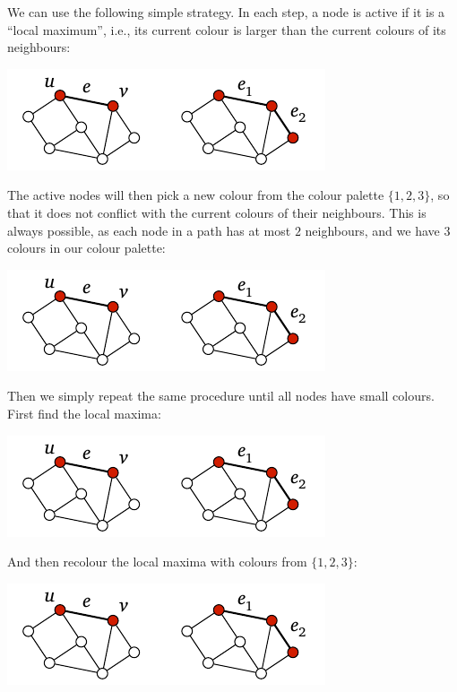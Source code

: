 We can use the following simple strategy. In each step, a node is active if it is a ``local maximum'', i.e., its current colour is larger than the current colours of its neighbours:
\begin{center}
    \includegraphics[page=\PIntroIdA]{figs.pdf}
\end{center}
The active nodes will then pick a new colour from the colour palette $\{1,2,3\}$, so that it does not conflict with the current colours of their neighbours. This is always possible, as each node in a path has at most $2$ neighbours, and we have $3$ colours in our colour palette:
\begin{center}
    \includegraphics[page=\PIntroIdAA]{figs.pdf}
\end{center}
Then we simply repeat the same procedure until all nodes have small colours. First find the local maxima:
\begin{center}
    \includegraphics[page=\PIntroIdB]{figs.pdf}
\end{center}
And then recolour the local maxima with colours from $\{1,2,3\}$:
\begin{center}
    \includegraphics[page=\PIntroIdBB]{figs.pdf}
\end{center}
